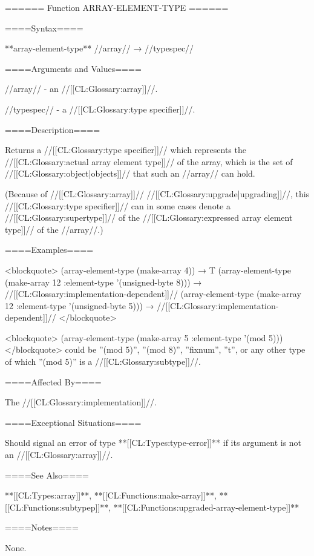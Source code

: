 ====== Function ARRAY-ELEMENT-TYPE ======

====Syntax====

**array-element-type** //array// → //typespec//

====Arguments and Values====

//array// - an //[[CL:Glossary:array]]//.

//typespec// - a //[[CL:Glossary:type specifier]]//.

====Description====

Returns a //[[CL:Glossary:type specifier]]// which represents the //[[CL:Glossary:actual array element type]]// of the array, which is the set of //[[CL:Glossary:object|objects]]// that such an //array// can hold.

(Because of //[[CL:Glossary:array]]// //[[CL:Glossary:upgrade|upgrading]]//, this //[[CL:Glossary:type specifier]]// can in some cases denote a //[[CL:Glossary:supertype]]// of the //[[CL:Glossary:expressed array element type]]// of the //array//.)

====Examples====

<blockquote> (array-element-type (make-array 4)) → T (array-element-type (make-array 12 :element-type '(unsigned-byte 8))) → //[[CL:Glossary:implementation-dependent]]// (array-element-type (make-array 12 :element-type '(unsigned-byte 5))) → //[[CL:Glossary:implementation-dependent]]// </blockquote>

<blockquote> (array-element-type (make-array 5 :element-type '(mod 5))) </blockquote> could be ''(mod 5)'', ''(mod 8)'', ''fixnum'', ''t'', or any other type of which ''(mod 5)'' is a //[[CL:Glossary:subtype]]//.

====Affected By====

The //[[CL:Glossary:implementation]]//.

====Exceptional Situations====

Should signal an error of type **[[CL:Types:type-error]]** if its argument is not an //[[CL:Glossary:array]]//.

====See Also====

**[[CL:Types:array]]**, **[[CL:Functions:make-array]]**, **[[CL:Functions:subtypep]]**, **[[CL:Functions:upgraded-array-element-type]]**

====Notes====

None.

